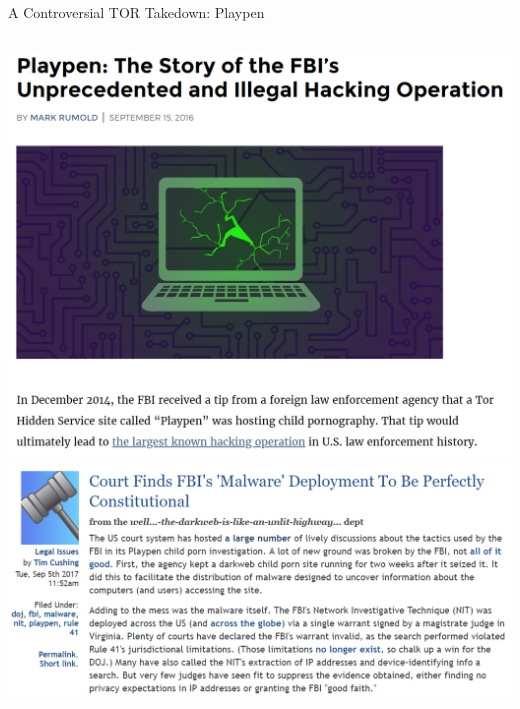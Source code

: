 \documentclass[nobackground,dvipsnames,table,aspectratio=169]{beamer}
\begin{document}
\begin{frame}{A Controversial TOR Takedown: Playpen}
    \begin{columns}
            \includegraphics[width=1.5\textwidth]{playpen-article}
            \includegraphics[width=\textwidth]{playpen-court-article}
    \end{columns}
\end{frame}
\end{document}

